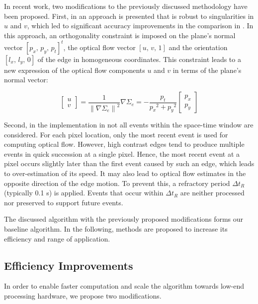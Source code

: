 In recent work, two modifications to the previously discussed methodology have been proposed. First, in \citet{Brosch2015} an approach is presented that is robust to singularities in $u$ and $v$, which led to significant accuracy improvements in the comparison in \citet{Ruckauer2016}. In this approach, an orthogonality constraint is imposed on the plane's normal vector $\left[p_x,\,p_y,\,p_t\right]^t$, the optical flow vector $\left[u,\,v,\,1\right]$ and the orientation $\left[l_x,\,l_y,\,0\right]$ of the edge in homogeneous coordinates. This constraint leads to a new expression of the optical flow components $u$ and $v$ in terms of the plane's normal vector:

\begin{equation}
\label{eq:slopes_to_flow}
\left[ {\begin{array}{*{20}{c}}
	u\\
	v
	\end{array}} \right] = \frac{1}{{{{\left\| {\nabla {\Sigma _e}} \right\|}^2}}}\nabla {\Sigma _e} = -\frac{{{p_t}}}{{{p_x}^2 + {p_y}^2}}\left[ {\begin{array}{*{20}{c}}
	{{p_x}}\\
	{{p_y}}
	\end{array}} \right]
\end{equation}

Second, in the implementation in \cite{Ruckauer2016} not all events within the space-time window are considered. For each pixel location, only the most recent event is used for computing optical flow. However, high contrast edges tend to produce multiple events in quick succession at a single pixel. Hence, the most recent event at a pixel occurs slightly later than the first event caused by such an edge, which leads to over-estimation of its speed. It may also lead to optical flow estimates in the opposite direction of the edge motion. To prevent this, a refractory period $\Delta t_R$ (typically 0.1 s) is applied. Events that occur within $\Delta t_R$ are neither processed nor preserved to support future events.

The discussed algorithm with the previously proposed modifications forms our baseline algorithm. In the following, methods are proposed to increase its efficiency and range of application. 

\subsection{Efficiency Improvements}
\label{sec:eof_efficiency_improvements}
In order to enable faster computation and scale the algorithm towards low-end processing hardware, we propose two modifications. 

